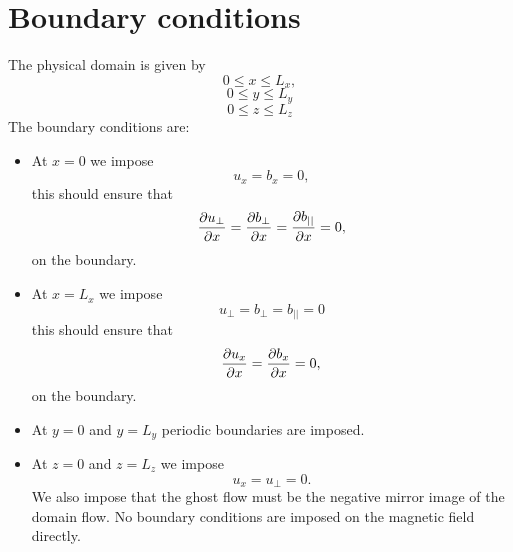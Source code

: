 \documentclass{article}
\begin{document}

\section*{Boundary conditions}

The physical domain is given by
\[0\le x\le L_x,\]
\[0\le y\le L_y\]
\[0 \le z \le L_z\]
The boundary conditions are:
\begin{itemize}
    \item At $x=0$ we impose
    \[u_x=b_x=0,\]
    this should ensure that
    \[\pdv{u_\perp}{x}=\pdv{b_\perp}{x}=\pdv{b_{||}}{x}=0,\]
    on the boundary.
    
    \item At $x=L_x$ we impose
    \[u_\perp=b_\perp=b_{||}=0\]
    this should ensure that
    \[\pdv{u_x}{x}=\pdv{b_x}{x}=0,\]
    on the boundary.
    
    \item At $y=0$ and $y=L_y$ periodic boundaries are imposed.
    \item At $z=0$ and $z=L_z$ we impose
    \[u_x=u_\perp=0.\]
    We also impose that the ghost flow must be the negative mirror image of the domain flow. No boundary conditions are imposed on the magnetic field directly.
    
\end{itemize}
\end{document}
